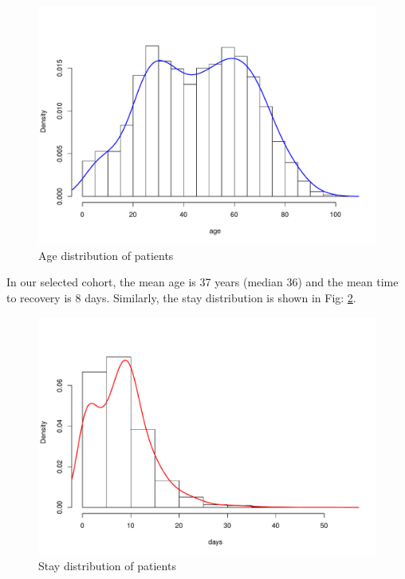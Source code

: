 \documentclass[letterpaper]{article} %
\begin{document}
	\begin{figure}[h]
		\centering
		\includegraphics[width=0.9\linewidth]{age}
		\caption{{Age} \normalcolor distribution of patients}
		\label{fig:age}
	\end{figure}
	
	In our selected cohort, the mean age is 37 years (median 36) and the mean time to recovery is 8 days. Similarly, the stay distribution is shown in Fig: \ref{fig:stay}. 
	
	
	\begin{figure}[h]
		\centering
		\includegraphics[width=0.9\linewidth]{stay}
		\caption{ {Stay} \normalcolor distribution of patients}
		\label{fig:stay}
	\end{figure}
	
\end{document}
